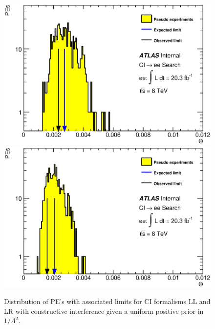     \begin{figure}[h]
        \begin{center}
            \includegraphics[width=0.49\linewidth]{images/ee__LL_minus_L2/Theta.eps}
            \includegraphics[width=0.49\linewidth]{images/ee__LR_minus_L2/Theta.eps}
        \end{center}
       \caption{Distribution of PE's with associated limits for CI formalisms LL and LR with constructive interference given a uniform positive prior in $1/\Lambda^{2}$.}
       \label{fig:Theta_CI_main}
    \end{figure}




